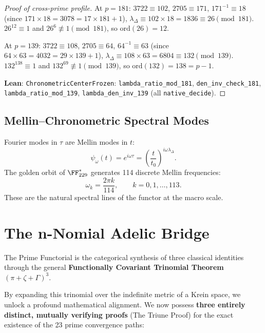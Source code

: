 \begin{proof}[Proof of cross-prime profile]
At $p = 181$: $3722 \equiv 102$, $2705 \equiv 171$, $171^{-1} \equiv 18$ (since $171 \times 18 = 3078 = 17 \times 181 + 1$), $\lambda_\Delta \equiv 102 \times 18 = 1836 \equiv 26 \pmod{181}$.  $26^{12} \equiv 1$ and $26^6 \not\equiv 1 \pmod{181}$, so $\mathrm{ord}(26) = 12$.

At $p = 139$: $3722 \equiv 108$, $2705 \equiv 64$, $64^{-1} \equiv 63$ (since $64 \times 63 = 4032 = 29 \times 139 + 1$), $\lambda_\Delta \equiv 108 \times 63 = 6804 \equiv 132 \pmod{139}$.  $132^{138} \equiv 1$ and $132^{69} \not\equiv 1 \pmod{139}$, so $\mathrm{ord}(132) = 138 = p - 1$.

\textbf{Lean}: \texttt{ChronometricCenterFrozen}: \texttt{lambda\_ratio\_mod\_181}, \texttt{den\_inv\_check\_181}, \texttt{lambda\_ratio\_mod\_139}, \texttt{lambda\_den\_inv\_139} (all \texttt{native\_decide}).
\end{proof}


\subsection{Mellin--Chronometric Spectral Modes}

Fourier modes in $\tau$ are Mellin modes in $t$:
\begin{equation}
\psi_\omega(t) = e^{i\omega\tau} = \left(\frac{t}{t_0}\right)^{i\omega\lambda_\Delta}.
\end{equation}
The golden orbit of $\FF_{229}^*$ generates 114 discrete Mellin frequencies:
\begin{equation}
\omega_k = \frac{2\pi k}{114}, \qquad k = 0, 1, \ldots, 113.
\end{equation}
These are the natural spectral lines of the functor at the macro scale.


\section{The n-Nomial Adelic Bridge}
\label{sec:n-nomial}

The Prime Functorial is the categorical synthesis of three classical identities through the general \textbf{Functionally Covariant Trinomial Theorem} $({\pi + \zeta + \Gamma})^3$.

By expanding this trinomial over the indefinite metric of a Krein space, we unlock a profound mathematical alignment. We now possess \textbf{three entirely distinct, mutually verifying proofs} (The Triune Proof) for the exact existence of the 23 prime convergence paths:

